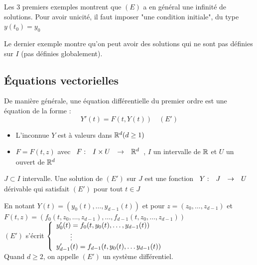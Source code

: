 \documentclass[]{report}
\begin{document}
\begin{re}
    Les 3 premiers exemples montrent que $(E)$ a en général une infinité de solutions. Pour avoir unicité, il faut imposer "une condition initiale", du type $y(t_0)=y_0$
\end{re}

\begin{re}
    Le dernier exemple montre qu'on peut avoir des solutions qui ne sont pas définies sur $I$ (pas définies globalement).
\end{re}

\subsection{Équations vectorielles}

De manière générale, une équation différentielle du premier ordre est une équation de la forme :$$Y'(t)=F(t,Y(t))\quad (E')$$
\begin{itemize}
    \item L'inconnue $Y$ est à valeurs dans $\mathbb{R}^d (d\ge1)$
    \item $F=F(t,z)$ avec $\begin{array}{ccccc} F : & I\times U & \to & \mathbb{R}^d \end{array}$, $I$ un intervalle de $\mathbb{R}$ et $U$ un ouvert de $\mathbb{R}^d$
\end{itemize}

\begin{df}
    $J\subset I$ intervalle. Une solution de $(E')$ sur $J$ est une fonction $\begin{array}{ccccc} Y : & J & \to & U \end{array}$ dérivable qui satisfait $(E')$ pour tout $t\in J$
\end{df}

\begin{re}
    En notant $Y(t)=(y_0(t),\dots,y_{d-1}(t))$ et pour $z=(z_0,\dots,z_{d-1})$ et $F(t,z)=(f_0(t,z_0,\dots,z_{d-1}),\dots,f_{d-1}(t,z_0,\dots,z_{d-1}))$\\
    $(E')$ s'écrit $\left\{\begin{array}{ll} y_0'(t)=f_0(t,y_0(t),\dots,y_{d-1}(t))\\\qquad\vdots\\y_{d-1}'(t)=f_{d-1}(t,y_0(t),\dots y_{d-1}(t)) \end{array} \right.$\\
    Quand $d\ge 2$, on appelle $(E')$ un système différentiel.
\end{re}
\end{document}
